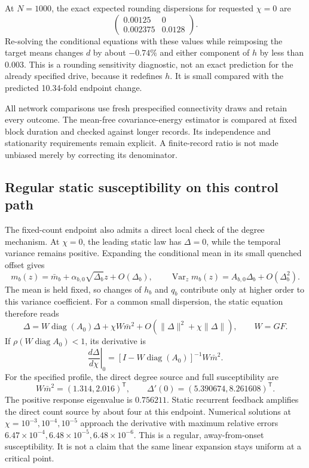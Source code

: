 At \(N=1000\), the exact expected rounding dispersions for requested
\(\chi=0\) are
\[
 \begin{pmatrix}0.00125&0\\0.002375&0.0128\end{pmatrix}.
\]
Re-solving the conditional equations with these values while reimposing the
target means changes \(d\) by about \(-0.74\%\) and either component of \(h\)
by less than \(0.003\). This is a rounding sensitivity diagnostic, not an
exact prediction for the already specified drive, because it redefines
\(h\). It is small compared with the predicted 10.34-fold endpoint change.

All network comparisons use fresh prespecified connectivity draws and retain
every outcome. The mean-free covariance-energy estimator is compared at fixed
block duration and checked against longer records. Its independence and
stationarity requirements remain explicit. A finite-record ratio is not
made unbiased merely by correcting its denominator.

\subsection{Regular static susceptibility on this control path}

The fixed-count endpoint also admits a direct local check of the degree
mechanism. At \(\chi=0\), the leading static law has \(\Delta=0\), while the
temporal variance remains positive. Expanding the conditional mean in its
small quenched offset gives
\[
 m_b(z)=\bar m_b+\alpha_{b,0}\sqrt{\Delta_b}z+O(\Delta_b),
 \qquad
 \operatorname{Var}_z m_b(z)=A_{b,0}\Delta_b+O(\Delta_b^2).
\]
The mean is held fixed, so changes of \(h_b\) and \(q_b\) contribute only at
higher order to this variance coefficient. For a common small dispersion,
the static equation therefore reads
\[
 \Delta=W\operatorname{diag}(A_0)\Delta+
          \chi W\bar m^2+O(\|\Delta\|^2+\chi\|\Delta\|),
 \qquad W=GF.
\]
If \(\rho(W\operatorname{diag}A_0)<1\), its derivative is
\[
 \left.\frac{d\Delta}{d\chi}\right|_{0}
 =[I-W\operatorname{diag}(A_0)]^{-1}W\bar m^2.
\]
For the specified profile, the direct degree source and full susceptibility are
\[
 W\bar m^2=(1.314,2.016)^{\mathsf T},\qquad
 \Delta'(0)=(5.390674,8.261608)^{\mathsf T}.
\]
The positive response eigenvalue is
\(0.756211\). Static recurrent feedback amplifies the direct count source by
about four at this endpoint. Numerical solutions at
\(\chi=10^{-3},10^{-4},10^{-5}\) approach the derivative with maximum
relative errors \(6.47\times10^{-4},6.48\times10^{-5},6.48\times10^{-6}\).
This is a regular, away-from-onset susceptibility. It is not a claim that the
same linear expansion stays uniform at a critical point.
